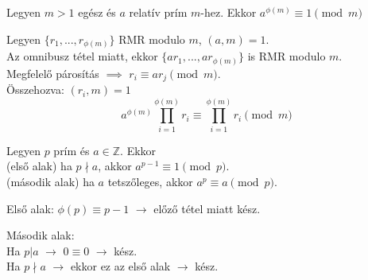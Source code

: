 \begin{frame}
  \begin{tcolorbox}[title={Tétel: Euler-Fermat tétel}]
    Legyen $m > 1$ egész és $a$ relatív prím $m$-hez. Ekkor $a^{{\phi}(m)} \equiv 1 \pmod{m}$
  \end{tcolorbox}

  \begin{tcolorbox}[title={Bizonyítás}]
    Legyen $\{ r_1, ..., r_{{\phi}(m)}\}$ RMR modulo $m$, $(a, m) = 1$.\\
    Az omnibusz tétel miatt, ekkor $\{ ar_1, ..., ar_{{\phi}(m)}\}$ is RMR modulo $m$.\\
    Megfelelő párosítás $\implies$ $r_i \equiv ar_j \pmod{m}$.\\
    Összehozva: $(r_i, m) = 1$\\
    \smallskip
    $$a^{{\phi}(m)} \prod^{{\phi}(m)}_{i=1} r_i \equiv \prod^{{\phi}(m)}_{i=1} r_i \pmod{m}$$
  \end{tcolorbox}
\end{frame}

\begin{frame}
  \begin{tcolorbox}[title={Tétel: (Kis) Fermat tétel}]
    Legyen $p$ prím és $a \in \mathbb{Z}$. Ekkor\\
    (első alak) ha $p \nmid a$, akkor $a^{p-1} \equiv 1 \pmod{p}$.\\
    (második alak) ha $a$ tetszőleges, akkor $a^p \equiv a \pmod{p}$.
  \end{tcolorbox}

  \begin{tcolorbox}[title={Bizonyítás}]
    Első alak: ${\phi}(p) \equiv p - 1$ $\rightarrow$ előző tétel miatt kész.\\
    \bigskip

    Második alak:\\
    Ha $p|a$ $\rightarrow$ $0 \equiv 0$ $\rightarrow$ kész.\\
    Ha $p{\nmid}a$ $\rightarrow$ ekkor ez az első alak $\rightarrow$ kész.
  \end{tcolorbox}
\end{frame}

